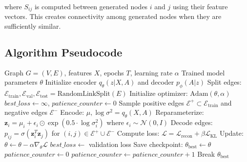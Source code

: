 \documentclass[12pt]{article}
\begin{document}
where $S_{ij}$ is computed between generated nodes $i$ and $j$ using their feature vectors. This creates connectivity among generated nodes when they are sufficiently similar.

\subsection{Algorithm Pseudocode}

\begin{algorithm}
\caption{AGN Training}
\begin{algorithmic}[1]
\REQUIRE Graph $G = (V, E)$, features $X$, epochs $T$, learning rate $\alpha$
\ENSURE Trained model parameters $\theta$
\STATE Initialize encoder $q_\theta(z|X,A)$ and decoder $p_\phi(A|z)$
\STATE Split edges: $\mathcal{E}_{\text{train}}, \mathcal{E}_{\text{val}}, \mathcal{E}_{\text{test}} = \text{RandomLinkSplit}(E)$
\STATE Initialize optimizer: $\text{Adam}(\theta, \alpha)$
\STATE $best\_loss \leftarrow \infty$, $patience\_counter \leftarrow 0$
    \STATE Sample positive edges $\mathcal{E}^+ \subset \mathcal{E}_{\text{train}}$ and negative edges $\mathcal{E}^-$
    \STATE Encode: $\mu, \log\sigma^2 = q_\theta(X, A)$
    \STATE Reparameterize: $\mathbf{z}_i = \mu_i + \epsilon_i \odot \exp(0.5 \cdot \log\sigma^2_i)$ where $\epsilon_i \sim \mathcal{N}(0,I)$
    \STATE Decode edges: $p_{ij} = \sigma(\mathbf{z}_i^T \mathbf{z}_j)$ for $(i,j) \in \mathcal{E}^+ \cup \mathcal{E}^-$
    \STATE Compute loss: $\mathcal{L} = \mathcal{L}_{\text{recon}} + \beta \mathcal{L}_{\text{KL}}$
    \STATE Update: $\theta \leftarrow \theta - \alpha \nabla_\theta \mathcal{L}$
        \STATE $best\_loss \leftarrow$ validation loss
        \STATE Save checkpoint: $\theta_{\text{best}} \leftarrow \theta$
        \STATE $patience\_counter \leftarrow 0$
    \ELSE
        \STATE $patience\_counter \leftarrow patience\_counter + 1$
            \STATE Break
        \ENDIF
    \ENDIF
\ENDFOR
\RETURN $\theta_{\text{best}}$
\end{algorithmic}
\end{algorithm}
\end{document}
